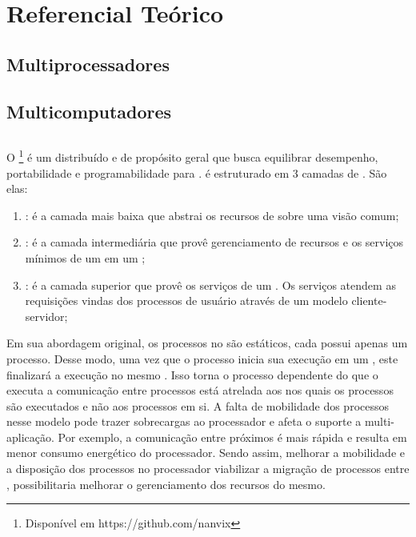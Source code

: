 \chapter{Referencial Teórico}
\label{chap.background}

\section{Multiprocessadores}
\label{sec.multiprocessadores}

\section{Multicomputadores}
\label{sec.multicomputadores}

\section{\Lws}
\label{sec.lw}

\section{\nanvix}
O \nanvix\footnote{Disponível em https://github.com/nanvix} é um \os distribuído e de propósito geral que busca equilibrar desempenho, portabilidade e programabilidade para \lws  \cite{penna:sbesc19}. \nanvix é estruturado em 3 camadas de . São elas:
\begin{enumerate}[label=(\roman*)]
    \item \nanvix \hal: é a camada mais baixa que abstrai os recursos de \hardware sobre uma visão comum;
    
    \item \nanvix \microkernel: é a camada intermediária que provê gerenciamento de recursos e os serviços mínimos de um \os em um \cluster;
    
    \item \nanvix \multikernel: é a camada superior que provê os serviços de um \os. Os serviços atendem as requisições vindas dos processos de usuário através de um modelo cliente-servidor;
\end{enumerate}
    
Em sua abordagem original, os processos no \nanvix são estáticos, \ie cada \cluster possui apenas um processo. Desse modo, uma vez que o processo inicia sua execução em um \cluster, este finalizará a execução no mesmo \cluster. 
Isso torna o processo dependente do \cluster que o executa \eg a comunicação entre processos está atrelada aos \clusters nos quais os processos são executados e não aos processos em si. A falta de mobilidade dos processos nesse modelo pode trazer sobrecargas ao processador e afeta o suporte a multi-aplicação. Por exemplo, a comunicação entre \clusters próximos é mais rápida e resulta em menor consumo energético do processador. Sendo assim, melhorar a mobilidade e a disposição dos processos no processador \ie viabilizar a migração de processos entre \clusters, possibilitaria melhorar o gerenciamento dos recursos do mesmo.

